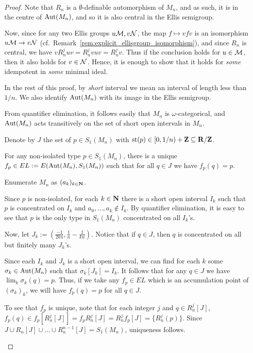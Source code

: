 	\begin{proof}
		Note that $R_n$ is a $\emptyset$-definable automorphism of $M_n$, and as such, it is in the centre of $\operatorname{{Aut}}(M_n)$, and so it is also central in the Ellis semigroup.
		
		Now, since for any two Ellis groups $u{\mathcal M},v{\mathcal N}$, the map $f\mapsto vfv$ is an isomorphism $u{\mathcal M}\to v{\mathcal N}$ (cf.\ Remark~\ref{rem:explicit_ellisgroup_isomorphism}), and since $R_n$ is central, we have $vR_n^juv=R_n^jvuv=R_n^jv$. Thus if the conclusion holds for $u\in {\mathcal M}$, then it also holds for $v
		\in {\mathcal N}$. Hence, it is enough to show that it holds for \emph{some} idempotent in \emph{some} minimal ideal.
		
		In the rest of this proof, by \emph{short} interval we mean an interval of length less than $1/n$. We also identify $\operatorname{{Aut}}(M_n)$ with its image in the Ellis semigroup.
		
		From quantifier elimination, it follows easily that $M_n$ is $\omega$-categorical, and $\operatorname{{Aut}}(M_n)$ acts transitively on the set of short open intervals in $M_n$.
		
		Denote by $J$ the set of $p\in S_1(M_n)$ with $\operatorname{{st}}(p)\in [0,1/n) + {\mathbf{Z}} \subseteq {\mathbf{R}}/{\mathbf{Z}}$.
		
		\begin{clm*}
			For any non-isolated type $p\in S_1(M_n)$, there is a unique $f_{p}\in EL:=E(\operatorname{{Aut}}(M_n),S_1(M_n))$ such that for all $q\in J$ we have $f_p(q)=p$.
		\end{clm*}
		\begin{clmproof}
			Enumerate $M_n$ as $(a_k)_{k\in {\mathbf{N}}}$.
			
			Since $p$ is non-isolated, for each $k\in {\mathbf{N}}$ there is a short open interval $I_k$ such that $p$ is concentrated on $I_k$ and $a_0,\ldots,a_k\notin I_k$. By quantifier elimination, it is easy to see that $p$ is the only type in $S_1(M_n)$ concentrated on all $I_k$'s.
			
			Now, let $J_k:=(\frac{-1}{2kn},\frac{1}{n}-\frac{1}{kn})$. Notice that if $q\in J$, then $q$ is concentrated on all but finitely many $J_k$'s.
			
			Since each $I_k$ and $J_k$ is a short open interval, we can find for each $k$ some $\sigma_k\in \operatorname{{Aut}}(M_n)$ such that $\sigma_k[J_k]=I_k$. It follows that for any $q\in J$ we have $\lim_k\sigma_k(q)=p$. Thus, if we take any $f_p\in EL$ which is an accumulation point of $(\sigma_k)_k$, we will have $f_p(q)=p$ for all $q \in J$.
			
			To see that $f_p$ is unique, note that for each integer $j$ and $q\in R_n^j[J]$, $f_p(q)\in f_p[R_n^j[J]]=f_pR_n^j[J]=R_n^j f_p[J]=\{R_n^j(p)\}$. Since $J\cup R_n[J]\cup\ldots\cup R_n^{n-1}[J]=S_1(M_n)$, uniqueness follows.
		\end{clmproof}
		

\end{proof}

